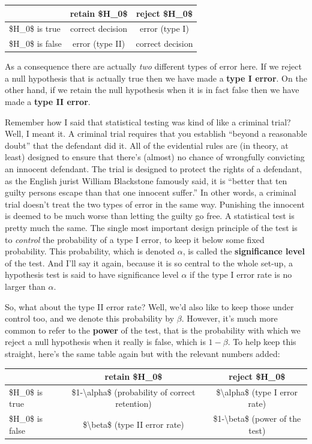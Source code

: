 \documentclass[
]{book}
\begin{document}
\begin{tabular}{l|c|c}
\hline
 & retain \$H\_0\$ & reject \$H\_0\$\\
\hline
\$H\_0\$ is true & correct decision & error (type I)\\
\hline
\$H\_0\$ is false & error (type II) & correct decision\\
\hline
\end{tabular}

As a consequence there are actually \emph{two} different types of error here. If we reject a null hypothesis that is actually true then we have made a {\textbf{type I error}}. On the other hand, if we retain the null hypothesis when it is in fact false then we have made a {\textbf{type II error}}.

Remember how I said that statistical testing was kind of like a criminal trial? Well, I meant it. A criminal trial requires that you establish ``beyond a reasonable doubt'' that the defendant did it. All of the evidential rules are (in theory, at least) designed to ensure that there's (almost) no chance of wrongfully convicting an innocent defendant. The trial is designed to protect the rights of a defendant, as the English jurist William Blackstone famously said, it is ``better that ten guilty persons escape than that one innocent suffer.'' In other words, a criminal trial doesn't treat the two types of error in the same way. Punishing the innocent is deemed to be much worse than letting the guilty go free. A statistical test is pretty much the same. The single most important design principle of the test is to \emph{control} the probability of a type I error, to keep it below some fixed probability. This probability, which is denoted \(\alpha\), is called the {\textbf{significance level}} of the test. And I'll say it again, because it is so central to the whole set-up, a hypothesis test is said to have significance level \(\alpha\) if the type I error rate is no larger than \(\alpha\).

So, what about the type II error rate? Well, we'd also like to keep those under control too, and we denote this probability by \(\beta\). However, it's much more common to refer to the {\textbf{power}} of the test, that is the probability with which we reject a null hypothesis when it really is false, which is \(1-\beta\). To help keep this straight, here's the same table again but with the relevant numbers added:

\begin{tabular}{l|c|c}
\hline
 & retain \$H\_0\$ & reject \$H\_0\$\\
\hline
\$H\_0\$ is true & \$1-\textbackslash{}alpha\$ (probability of correct retention) & \$\textbackslash{}alpha\$ (type I error rate)\\
\hline
\$H\_0\$ is false & \$\textbackslash{}beta\$ (type II error rate) & \$1-\textbackslash{}beta\$  (power of the test)\\
\hline
\end{tabular}
\end{document}
